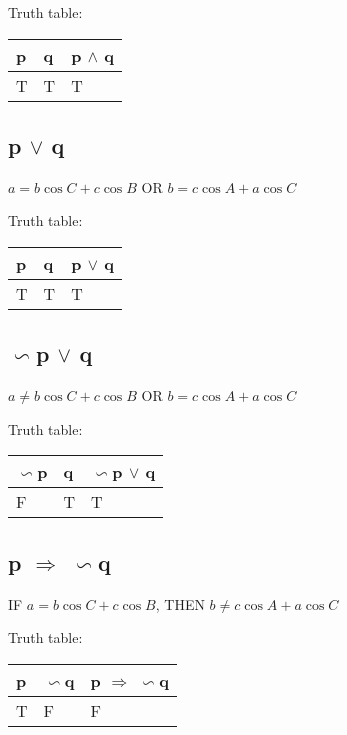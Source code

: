 \documentclass[11pt]{article}
\begin{document}
Truth table:\\
\begin{center}
\begin{tabular}{ |p{2.2cm}||p{1.9cm}||p{3.3cm}|  }
 \hline
 p & q & p $\wedge$ q\\
 \hline
 T & T & T \\
 \hline
\end{tabular}
\end{center} 

\subsection{p $\vee$ q}
$a=b\cos C+c \cos B$ OR $b=c \cos A+a \cos C$


Truth table:\\
\begin{center}
\begin{tabular}{ |p{2.2cm}||p{1.9cm}||p{3.3cm}|  }
 \hline
 p & q & p $\vee$ q\\
 \hline
 T & T & T \\
 \hline
\end{tabular}
\end{center} 
\newpage

\subsection{$\backsim$p $\vee$ q}
$a\neq b\cos C+c \cos B$ OR $b=c \cos A+a \cos C$


Truth table:\\
\begin{center}
\begin{tabular}{ |p{2.2cm}||p{1.9cm}||p{3.3cm}|  }
 \hline
 $\backsim$p & q & $\backsim$p $\vee$ q\\
 \hline
 F & T & T \\
 \hline
\end{tabular}
\end{center} 
\subsection{p $\Rightarrow$ $\backsim$q}
IF $a=b\cos C+c \cos B$, THEN $b \neq c\cos A +a \cos C$


Truth table:\\
\begin{center}
\begin{tabular}{ |p{2.2cm}||p{1.9cm}||p{3.3cm}|  }
 \hline
 p & $\backsim$q & p $\Rightarrow$ $\backsim$q\\
 \hline
 T & F & F \\
 \hline
\end{tabular}
\end{center} 
\end{document}
